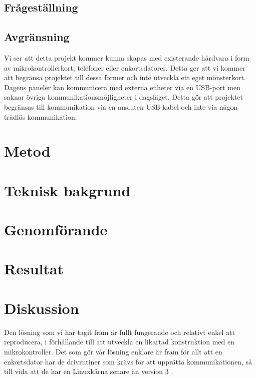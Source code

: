 \documentclass{article}
\begin{document}
		\subsection{Frågeställning} %
		\label{sub:fragestallning}
		

		\subsection{Avgränsning} %
		\label{sub:avgransning}
			Vi ser att detta projekt kommer kunna skapas med existerande hårdvara i form av mikrokontrollerkort, telefoner eller enkortsdatorer. Detta ger att vi kommer att begränsa projektet till dessa former och inte utveckla ett eget mönsterkort.\\

			\noindent Dagens paneler kan kommunicera med externa enheter via en USB-port men saknar övriga kommunikationsmöjligheter i dagsläget. Detta gör att projektet begränsas till kommunikation via en ansluten USB-kabel och inte via någon trådlös kommunikation.

	\section{Metod} %
	\label{sec:huvudtext}

	\section{Teknisk bakgrund} %
	\label{sec:teknisk_bakgrund}
	

	\section{Genomförande} %
	\label{sec:genomf_rande}
	

	\section{Resultat} %
	\label{sec:resultat}


	\section{Diskussion} %
	\label{sec:sammanfattning}
		Den lösning som vi har tagit fram är fullt fungerande och relativt enkel att reproducera, i förhållande till att utveckla en likartad konstruktion med en mikrokontroller. Det som gör vår lösning enklare är fram för allt att en enkortsdator har de drivrutiner som krävs för att upprätta kommunikationen, så till vida att de har en Linuxkärna senare än version 3 \citep{silicon}.

	\newpage\printbibliography		
\end{document}
